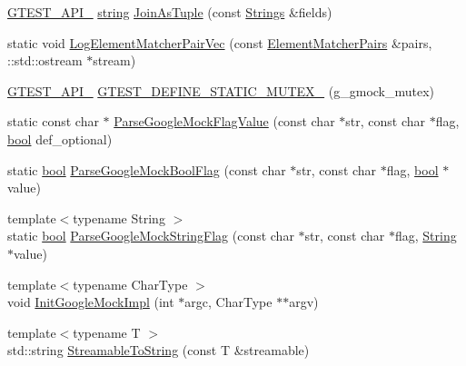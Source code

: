 \begin{DoxyCompactItemize}
\item 
\hyperlink{gtest-port_8h_aa73be6f0ba4a7456180a94904ce17790}{G\+T\+E\+S\+T\+\_\+\+A\+P\+I\+\_\+} \hyperlink{namespacetesting_1_1internal_a8e8ff5b11e64078831112677156cb111}{string} \hyperlink{namespacetesting_1_1internal_a61d60981533cb0875bad9025e0d98b74}{Join\+As\+Tuple} (const \hyperlink{namespacetesting_1_1internal_a7706b17f05f4b49e351b052ae4e05073}{Strings} \&fields)
\item 
static void \hyperlink{namespacetesting_1_1internal_a7e3ffe5f66db16c3ab89de55eac65bfa}{Log\+Element\+Matcher\+Pair\+Vec} (const \hyperlink{namespacetesting_1_1internal_a0038618710c01a71150887dc7cfb0a29}{Element\+Matcher\+Pairs} \&pairs, \+::std\+::ostream $\ast$stream)
\item 
\hyperlink{gtest-port_8h_aa73be6f0ba4a7456180a94904ce17790}{G\+T\+E\+S\+T\+\_\+\+A\+P\+I\+\_\+} \hyperlink{namespacetesting_1_1internal_a8c4aa7be8daa7b60e293071d70a89584}{G\+T\+E\+S\+T\+\_\+\+D\+E\+F\+I\+N\+E\+\_\+\+S\+T\+A\+T\+I\+C\+\_\+\+M\+U\+T\+E\+X\+\_\+} (g\+\_\+gmock\+\_\+mutex)
\item 
static const char $\ast$ \hyperlink{namespacetesting_1_1internal_af9eac3bda47b1fa0b8e43d1d1d3a0b16}{Parse\+Google\+Mock\+Flag\+Value} (const char $\ast$str, const char $\ast$flag, \hyperlink{classbool}{bool} def\+\_\+optional)
\item 
static \hyperlink{classbool}{bool} \hyperlink{namespacetesting_1_1internal_a137bff8177d6158f59ab4ce603577293}{Parse\+Google\+Mock\+Bool\+Flag} (const char $\ast$str, const char $\ast$flag, \hyperlink{classbool}{bool} $\ast$value)
\item 
{\footnotesize template$<$typename String $>$ }\\static \hyperlink{classbool}{bool} \hyperlink{namespacetesting_1_1internal_afb359266feb817d9943854b76574817d}{Parse\+Google\+Mock\+String\+Flag} (const char $\ast$str, const char $\ast$flag, \hyperlink{classtesting_1_1internal_1_1String}{String} $\ast$value)
\item 
{\footnotesize template$<$typename Char\+Type $>$ }\\void \hyperlink{namespacetesting_1_1internal_a3823844199df88af9493026031cf7744}{Init\+Google\+Mock\+Impl} (int $\ast$argc, Char\+Type $\ast$$\ast$argv)
\item 
{\footnotesize template$<$typename T $>$ }\\std\+::string \hyperlink{namespacetesting_1_1internal_aad4beed95d0846e6ffc5da0978ef3bb9}{Streamable\+To\+String} (const T \&streamable)
\item 
$$
\end{DoxyCompactItemize}
